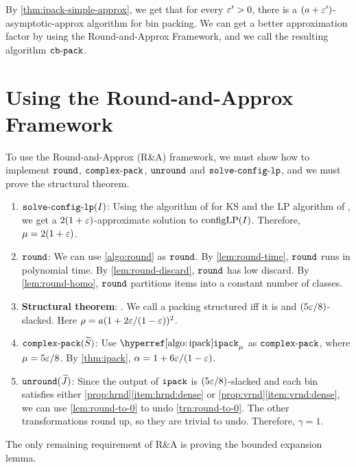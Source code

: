 By \cref{thm:ipack-simple-approx}, we get that for every $\varepsilon' > 0$, there is a
$(a + \varepsilon')$-asymptotic-approx algorithm for  bin packing.
We can get a better approximation factor by using the Round-and-Approx Framework,
and we call the resulting algorithm $\operatorname{\mathtt{cb-pack}}$.

\section{Using the Round-and-Approx Framework}
\label{sec:gv-rbbp:rna}

To use the Round-and-Approx (R\&A) framework, we must show how to implement
$\operatorname{\mathtt{round}}$, $\operatorname{\mathtt{complex-pack}}$, $\operatorname{\mathtt{unround}}$ and $\operatorname{\mathtt{solve-config-lp}}$,
and we must prove the structural theorem.

\begin{enumerate}
\item \textbf{$\operatorname{\mathtt{solve-config-lp}}(I)$}:
Using the algorithm of \cite{aco-gvks} for  KS
and the LP algorithm of \cite{eku-pst},
we get a $2(1+\varepsilon)$-approximate solution to $\operatorname{configLP}(I)$. Therefore, $\mu = 2(1+\varepsilon)$.

\item \textbf{$\operatorname{\mathtt{round}}$}: We can use \cref{algo:round} as $\operatorname{\mathtt{round}}$.
By \cref{lem:round-time}, $\operatorname{\mathtt{round}}$ runs in polynomial time.
By \cref{lem:round-discard}, $\operatorname{\mathtt{round}}$ has low discard.
By \cref{lem:round-homo}, $\operatorname{\mathtt{round}}$ partitions items into a constant number of classes.

\item \textbf{Structural theorem}: .
We call a packing structured iff it is \compartmentalHyp{} and $(5\varepsilon/8)$-slacked.
Here $\rho = a(1+2\varepsilon/(1-\varepsilon))^2$.

\item \textbf{$\operatorname{\mathtt{complex-pack}}(\widetilde{S})$}:
Use $\ipackHyp_{\mu}$ as $\operatorname{\mathtt{complex-pack}}$, where $\mu = 5\varepsilon/8$.
By \cref{thm:ipack}, $\alpha = 1 + 6\varepsilon/(1-\varepsilon)$.

\item \textbf{$\operatorname{\mathtt{unround}}(\widetilde{J})$}:
Since the output of $\operatorname{\mathtt{ipack}}$ is $(5\varepsilon/8)$-slacked and each bin satisfies
either \cref{prop:hrnd}\ref{item:hrnd:dense} or \cref{prop:vrnd}\ref{item:vrnd:dense},
we can use \cref{lem:round-to-0} to undo \cref{trn:round-to-0}.
The other transformations round up, so they are trivial to undo.
Therefore, $\gamma = 1$.
\end{enumerate}

The only remaining requirement of R\&A is proving
the bounded expansion lemma.

